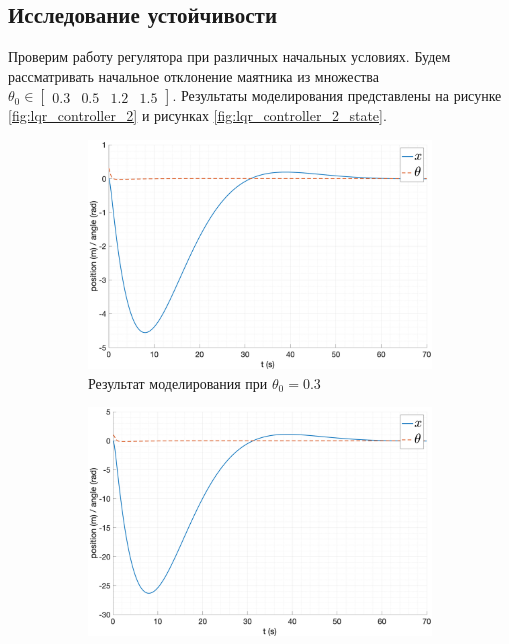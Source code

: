 \subsection{Исследование устойчивости}
Проверим работу регулятора при различных начальных условиях. Будем рассматривать начальное отклонение 
маятника из множества $\theta_0 \in \begin{bmatrix}0.3 & 0.5 & 1.2 & 1.5\end{bmatrix}$. 
Результаты моделирования представлены на рисунке \ref{fig:lqr_controller_2} и рисунках \ref{fig:lqr_controller_2_state}.
\begin{figure}[ht!]
    \centering
    \begin{subfigure}[b]{0.45\textwidth}
        \centering
        \includegraphics[width=\textwidth]{media/plots/LQR/out_2.png}
        \caption{Результат моделирования при $\theta_0 = 0.3$}
    \end{subfigure}
    \begin{subfigure}[b]{0.45\textwidth}
        \centering
        \includegraphics[width=\textwidth]{media/plots/LQR/out_3.png}

\end{subfigure}
\end{figure}

